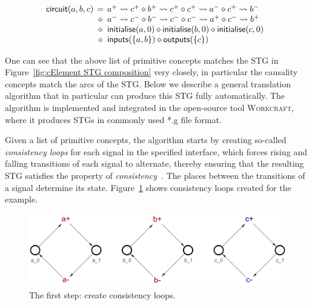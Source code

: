 \documentclass[british,compsoc]{IEEEtran}
\newcommand{\noun}[1]{\textsc{#1}}
\begin{document}
\vspace{-3mm}
\[
\begin{array}{lcl}
\hspace{-2mm}\mathsf{circuit}(a,b,c)&\hspace{-2mm}=&\hspace{-2mm}a^{+}\rightsquigarrow c^{+} \diamond b^{+}\rightsquigarrow c^{+} \diamond c^{+}\rightsquigarrow a^{-} \diamond c^{+}
\rightsquigarrow b^{-}\\
~&\hspace{-2mm}\diamond&\hspace{-2mm}a^{-}\rightsquigarrow c^{-} \diamond b^{-}\rightsquigarrow c^{-} \diamond c^{-}\rightsquigarrow a^{+} \diamond c^{-}\rightsquigarrow b^{+}\\
~&\hspace{-2mm}\diamond&\hspace{-2mm}\mathsf{initialise}(a,0) \diamond \mathsf{initialise}(b,0) \diamond \mathsf{initialise}(c,0)\\
~&\hspace{-2mm}\diamond&\hspace{-2mm}\mathsf{inputs}(\{a,b\})\diamond\mathsf{outputs}(\{c\})
\end{array}
\]

\noindent One can see that the above list of primitive concepts matches
the STG in Figure~\ref{fig:cElement STG composition} very closely, in particular
the causality concepts match the arcs of the STG. Below we describe a general
translation algorithm that in particular can produce this STG fully automatically.
The algorithm is implemented and integrated in the open-source tool \noun{Workcraft},
where it produces STGs in commonly used \textsf{*.g} file format.

Given a list of primitive concepts, the algorithm starts by creating so-called
\emph{consistency loops} for each signal in the specified interface, which forces rising
and falling transitions of each signal to alternate, thereby ensuring that the resulting
STG satisfies the property of \emph{consistency}~\cite{Cortadella}.
The places between the transitions of a signal determine its state.
Figure~\ref{fig:step-by-step1} shows consistency loops created for the example.

\begin{figure}[h]
\begin{centering}
\includegraphics[scale=0.23]{Images/Step-by-step1}
\par
\protect\caption{\label{fig:step-by-step1}The first step: create consistency loops.}
\vspace{-2mm}
\end{centering}
\end{figure}
\end{document}
